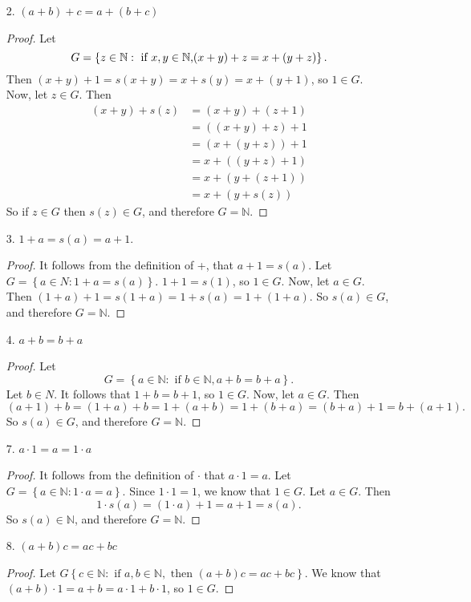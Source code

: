 \documentclass{article}
\newcommand{\N}{\mathbb{N}}
\begin{document}
\begin{enumerate}
	\item[2.] $(a + b) + c = a + (b + c)$
	\begin{proof}
		Let \[G = \left\{z\in \N: \text{ if } x,y \in \N \text, (x + y) + z = x + (y + z)\right\}.\]
		Then $(x + y) + 1 = s(x + y) = x + s(y) = x + (y + 1)$, so $1 \in G$.
		Now, let $z \in G$. Then 
		\begin{align*}
			(x + y) + s(z) &= (x + y) + (z + 1) \\&= ((x + y) + z) + 1 \\&= (x + (y + z)) + 1 \\&= x + ((y + z) + 1) \\&= x + (y + (z + 1)) \\&= x + (y + s(z))
		\end{align*}
		So if $z \in G$ then $s(z) \in G$, and therefore $G = \N$.
	\end{proof}
	\item[3.] $1 + a = s(a) = a + 1$.
	\begin{proof}
		It follows from the definition of +, that $a + 1 = s(a)$. Let $G = \left\{a \in N: 1 + a = s(a)\right\}$. $1 + 1 = s(1)$, so $1 \in G$. Now, let $a \in G$. Then $(1 + a) + 1 = s(1 + a) = 1 + s(a) = 1 + (1 + a)$. So $s(a) \in G$, and therefore $G = \N$.
	\end{proof}
	\item[4.] $a + b = b + a$
	\begin{proof}
		Let \[G = \left\{a \in \N: \text{ if } b \in \N, a + b = b + a \right\}.\]
		Let $b \in N$. It follows that $1 + b = b + 1$, so $1 \in G$. Now, let $a \in G$. Then \[(a + 1) + b = (1 + a) + b = 1 + (a + b) = 1 + (b + a) = (b + a) + 1 = b + (a + 1).\] So $s(a) \in G$, and therefore $G = \N$.
	\end{proof}
	\item[7.] $a \cdot 1 = a = 1 \cdot a$
	\begin{proof}
		It follows from the definition of $\cdot$ that $a \cdot 1 = a$. Let $G = \left\{a \in \N: 1 \cdot a = a\right\}$. Since $1 \cdot 1 = 1$, we know that $1 \in G$. Let $a \in G$. Then \[1 \cdot s(a) = (1 \cdot a) + 1 = a + 1 = s(a).\] So $s(a) \in \N$, and therefore $G = \N$.
	\end{proof}
	\item[8.] $(a + b)c = ac + bc$
	\begin{proof}
		Let $G \left\{c \in \N: \text{ if } a,b \in \N, \text{ then }(a + b)c = ac + bc\right\}$.
		We know that $(a + b) \cdot 1 = a + b = a \cdot 1 + b \cdot 1$, so $1 \in G$.

\end{proof}
\end{enumerate}
\end{document}
